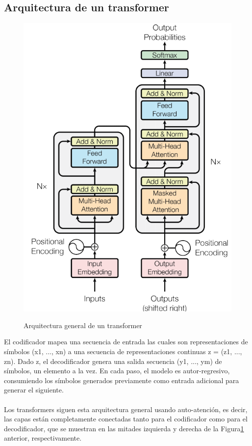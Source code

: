\documentclass[12pt, a4paper, titlepage]{report}
\begin{document}
		   		\subsection{Arquitectura de un transformer} 
		   		
		   		\begin{figure}[H] 
		   			\includegraphics[width=12cm]{./imagenes/MarcoTeorico/Transformerarchitecture.png}\label{ArqTransformer}
		   			\centering 
		   			\caption{Arquitectura general de un transformer \cite{refArqTransformer}}
		   		\end{figure}     
		        El codificador mapea una secuencia de entrada las cuales son representaciones de símbolos (x1, ..., xn) a una secuencia de representaciones continuas z = (z1, ..., zn). Dado z, el decodificador genera una salida secuencia (y1, ..., ym) de símbolos, un elemento a la vez. En cada paso, el modelo es autor-regresivo, consumiendo los símbolos generados previamente como entrada adicional para generar el siguiente.\\\\
		        Los transformers siguen esta arquitectura general usando auto-atención, es decir, las capas están completamente conectadas tanto para el codificador como para el decodificador, que se muestran en las mitades izquierda y derecha de la Figura\ref{ArqTransformer} anterior, respectivamente. \cite{refArqTransformer}
        
\end{document}
